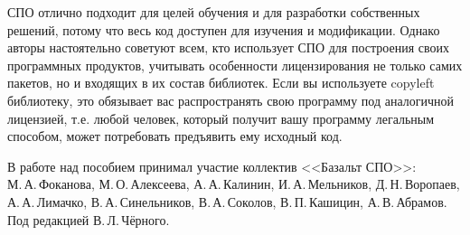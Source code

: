 СПО отлично подходит для целей обучения и для разработки собственных решений, потому что весь 
код доступен для изучения и модификации. Однако авторы настоятельно советуют всем, кто использует
СПО для построения своих программных продуктов, учитывать особенности лицензирования не только самих 
пакетов, но и входящих в их состав библиотек. Если вы используете copyleft библиотеку, 
это обязывает вас распространять свою программу под аналогичной лицензией,  т.е. любой человек, который
получит вашу программу легальным способом, может потребовать предъявить ему исходный код.

В работе над пособием принимал участие коллектив <<Базальт СПО>>:\\
М.\,А.\,Фоканова, М.\,О.\,Алексеева, А.\,А.\,Калинин, И.\,А.\,Мельников, Д.\,Н.\,Воропаев, А.\,А.\,Лимачко, В.\,А.\,Синельников, В.\,А.\,Соколов, В.\,П.\,Кашицин, А.\,В.\,Абрамов. Под редакцией В.\,Л.\,Чёрного. 

